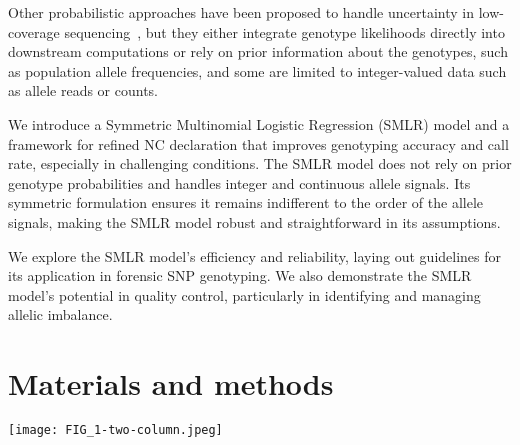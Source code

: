 \documentclass[preprint,5p,times,11pt]{elsarticle}
\begin{document}
Other probabilistic approaches have been proposed to handle uncertainty in low-coverage sequencing~\cite{mostad}, but they either integrate genotype likelihoods directly into downstream computations or rely on prior information about the genotypes, such as population allele frequencies, and some are limited to integer-valued data such as allele reads or counts.

We introduce a Symmetric Multinomial Logistic Regression (SMLR) model and a framework for refined NC declaration that improves genotyping accuracy and call rate, especially in challenging conditions.
The SMLR model does not rely on prior genotype probabilities and handles integer and continuous allele signals.
Its symmetric formulation ensures it remains indifferent to the order of the allele signals, making the SMLR model robust and straightforward in its assumptions.

We explore the SMLR model's efficiency and reliability, laying out guidelines for its application in forensic SNP genotyping.
We also demonstrate the SMLR model's potential in quality control, particularly in identifying and managing allelic imbalance.



\section{Materials and methods}
\begin{figure*}
\centering
\texttt{[image: FIG\_1-two-column.jpeg]}
\caption{
Genotype predictions for the examinations of \SI{31.25}{\pg} DNA.\\
Each plot displays 1,931~SNP observations classified using the genotyping methods:
HID SNP Genotyper Plugin~(HSG), Enforcing the Quality Checks~(EQC), and Symmetric Multinomial Logistic Regression~(SMLR).
A dot represents a set of read counts $(s_1, s_2)$ for an SNP.
It is coloured by the true genotype: red for heterozygous and blue or yellow for homozygous.
Failed genotype predictions are indicated by red crosses for wrong calls and black pluses for no-calls.
In the EQC plot~(middle), the grey areas show where the HSG is guaranteed to flag for allelic imbalance.
In the SMLR plot (right), the solid lines show the decision boundaries of the SMLR model with an intercept fitted to square-root transformed allele signals. The grey area marks the no-call zone where genotype probabilities fall short of the threshold $q = 0.9937$ (a value chosen for illustrative purpose).
Outside the grey area, the predicted genotype has $P(G \mid s_1, s_2) \geq q$.
}
\label{fig:methods}
\end{figure*}
\end{document}
